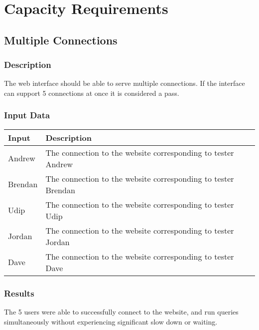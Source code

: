 \documentclass{scrreprt}
\begin{document}
\section{Capacity Requirements}

\subsection{Multiple Connections}
\subsubsection{Description}

The web interface should be able to serve multiple connections. If the
interface can support 5 connections at once it is considered a pass.

\subsubsection{Input Data}
\begin{table}[H]
        \centering
        \begin{tabular}{p{3cm}p{6cm}}
                \hline\hline
                Input & Description\\
                \hline\hline
                Andrew & The connection to the website corresponding to tester Andrew \\
                \hline
                Brendan & The connection to the website corresponding to tester Brendan \\
                \hline
                Udip & The connection to the website corresponding to tester Udip \\
                \hline
                Jordan & The connection to the website corresponding to tester Jordan \\
                \hline
                Dave & The connection to the website corresponding to tester Dave \\
                \hline
        \end{tabular}
\end{table}

\subsubsection{Results}

The 5 users were able to successfully connect to the website, and run queries
simultaneously without experiencing significant slow down or waiting.
\end{document}
